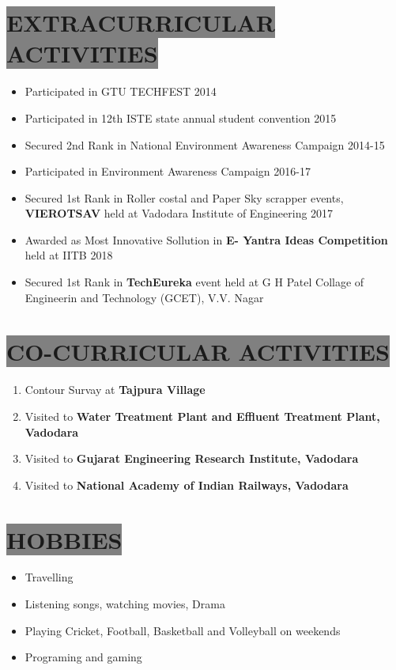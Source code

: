 \documentclass{res} %
\begin{document}
\begin{resume}
\section{
\colorbox{grey}{EXTRACURRICULAR ACTIVITIES}          
}
\begin{itemize} 
 \item Participated in GTU TECHFEST 2014
 \item Participated in 12th ISTE state annual student convention 2015
 \item Secured 2nd Rank in National Environment Awareness Campaign 2014-15
 \item Participated in Environment Awareness Campaign 2016-17
 \item Secured 1st Rank in Roller costal and Paper Sky scrapper events, \textbf{VIEROTSAV} held at Vadodara Institute of Engineering 2017
 \item Awarded as Most Innovative Sollution in \textbf{E- Yantra Ideas Competition} held at IITB 2018
 \item Secured 1st Rank in \textbf{TechEureka} event held at G H Patel Collage of Engineerin and Technology (GCET), V.V. Nagar
 \end{itemize}


\section{
\colorbox{grey}{CO-CURRICULAR ACTIVITIES} 
}         
\begin{enumerate} 
 \item Contour Survay at \textbf{Tajpura Village}
 \item Visited to \textbf{ Water Treatment Plant and Effluent Treatment Plant, Vadodara}
\item Visited to \textbf{ Gujarat Engineering Research Institute, Vadodara}
\item Visited to \textbf{ National Academy of Indian Railways, Vadodara }
 \end{enumerate}


\section{
\colorbox{grey}{HOBBIES}
}
\begin{itemize}
\item Travelling
\item Listening songs, watching movies, Drama
\item Playing Cricket, Football, Basketball and Volleyball on weekends
\item Programing and gaming
\end{itemize}







\end{resume}
\end{document}
